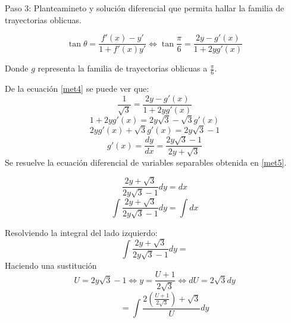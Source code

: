 \documentclass[12pt,letterpaper]{article}
\begin{document}
\begin{titlepage}
\begin{flushleft}
\vspace{0.3cm}
Paso 3: Planteamineto y solución diferencial que permita hallar la familia de trayectorias oblicuas.

\begin{equation} \tag{4} \label{met4}
\tan \theta = \frac{f'(x) - y'}{1+ f'(x)y'} \Leftrightarrow \tan \frac{\pi}{6} = \frac{ 2y - g'(x)}{1+ 2yg'(x)}
\end{equation}

\end{flushleft}
\end{titlepage}

\begin{titlepage}
\begin{flushleft}

Donde $g$ representa la familia de trayectorias oblicuas a $\frac{\pi}{6}$.

\vspace{0.4cm}
De la ecuación \eqref{met4} se puede ver que:
\begin{equation*} 
\frac{1}{\sqrt{3}} = \frac{ 2y - g'(x)}{1+ 2yg'(x)}
\end{equation*}
\vspace{0.2cm}
\begin{equation*} 
1+ 2yg'(x) = 2y \sqrt{3} - \sqrt{3}g'(x)
\end{equation*}
\vspace{0.1cm}
\begin{equation*} 
2yg'(x)+ \sqrt{3}g'(x) = 2y \sqrt{3} - 1
\end{equation*}
\vspace{0.1cm}
\begin{equation} \tag{5} \label{met5}
g'(x) = \frac{dy}{dx} = \frac{2y \sqrt{3} - 1} {2y + \sqrt{3}} 
\end{equation}
Se resuelve la ecuación diferencial de variables separables obtenida en \eqref{met5}. 

\begin{equation*}
\frac{2y + \sqrt{3}}{2y \sqrt{3} - 1}dy = dx 
\end{equation*}
\vspace{0.1cm}
\begin{equation*}
\int \frac{2y + \sqrt{3}}{2y \sqrt{3} - 1}dy  = \int dx
\end{equation*}

\vspace{0.1cm}	
Resolviendo la integral del lado izquierdo:
\begin{equation*} 
\int \frac{2y + \sqrt{3}}{2y \sqrt{3} - 1}dy =
\end{equation*}
Haciendo una sustitución
\begin{equation*}
U = 2y \sqrt{3} - 1 \Leftrightarrow y = \frac{U + 1}{2\sqrt{3}} \Leftrightarrow dU = 2 \sqrt{3} dy
\end{equation*}
\begin{equation*} 
 \hspace{1cm}= \int \frac{2(\frac{U + 1}{2 \sqrt{3}})+ \sqrt{3}}{U}dy 
\end{equation*}


\end{flushleft}
\end{titlepage}
\end{document}
